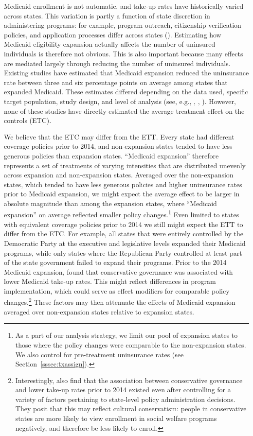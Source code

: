 \documentclass[aoas]{imsart}
\theoremstyle{plain}
\theoremstyle{remark}
\begin{document}
Medicaid enrollment is not automatic, and take-up rates have historically varied across states. This variation is partly a function of state discretion in administering programs: for example, program outreach, citizenship verification policies, and application processes differ across states (\cite{courtemanche2017early}). Estimating how Medicaid eligibility expansion actually affects the number of uninsured individuals is therefore not obvious. This is also important because many effects are mediated largely through reducing the number of uninsured individuals. Existing studies have estimated that Medicaid expansion reduced the uninsurance rate between three and six percentage points on average among states that expanded Medicaid. These estimates differed depending on the data used, specific target population, study design, and level of analysis (see, e.g., \cite{kaestner2017effects}, \cite{courtemanche2017early}, \cite{frean2017premium}). However, none of these studies have directly estimated the average treatment effect on the controls (ETC). 

We believe that the ETC may differ from the ETT. Every state had different coverage policies prior to 2014, and non-expansion states tended to have less generous policies than expansion states. ``Medicaid expansion'' therefore represents a set of treatments of varying intensities that are distributed unevenly across expansion and non-expansion states. Averaged over the non-expansion states, which tended to have less generous policies and higher uninsurance rates prior to Medicaid expansion, we might expect the average effect to be larger in absolute magnitude than among the expansion states, where ``Medicaid expansion'' on average reflected smaller policy changes.\footnote{As a part of our analysis strategy, we limit our pool of expansion states to those where the policy changes were comparable to the non-expansion states. We also control for pre-treatment uninsurance rates (see Section~\ref{sssec:txassign}).} Even limited to states with equivalent coverage policies prior to 2014 we still might expect the ETT to differ from the ETC. For example, all states that were entirely controlled by the Democratic Party at the executive and legislative levels expanded their Medicaid programs, while only states where the Republican Party controlled at least part of the state government failed to expand their programs. Prior to the 2014 Medicaid expansion, \cite{sommers2012understanding} found that conservative governance was associated with lower Medicaid take-up rates. This might reflect differences in program implementation, which could serve as effect modifiers for comparable policy changes.\footnote{Interestingly, \cite{sommers2012understanding} also find that the association between conservative governance and lower take-up rates prior to 2014 existed even after controlling for a variety of factors pertaining to state-level policy administration decisions. They posit that this may reflect cultural conservatism: people in conservative states are more likely to view enrollment in social welfare programs negatively, and therefore be less likely to enroll.} These factors may then attenuate the effects of Medicaid expansion averaged over non-expansion states relative to expansion states.
\end{document}
